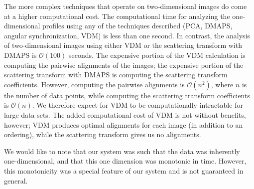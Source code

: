 \documentclass[10pt]{article}
\begin{document}
The more complex techniques that operate on two-dimensional images do come at a higher computational cost. 
%
The computational time for analyzing the one-dimensional profiles using any of the techniques described (PCA, DMAPS, angular synchronization, VDM) is less than one second. 
%
In contrast, the analysis of two-dimensional images using either VDM or the scattering transform with DMAPS is $\mathcal{O}(100)$ seconds.
%
The expensive portion of the VDM calculation is computing the pairwise alignments of the images; the expensive portion of the scattering transform with DMAPS is computing the scattering transform coefficients.
%
However, computing the pairwise alignments is $\mathcal{O}(n^2)$, where $n$ is the number of data points, while computing the scattering transform coefficients is $\mathcal{O}(n)$.
%
We therefore expect for VDM to be computationally intractable for large data sets.
%
The added computational cost of VDM is not without benefits, however; VDM produces optimal alignments for each image (in addition to an ordering), while the scattering transform gives us no alignments.

We would like to note that our system was such that the data was inherently one-dimensional, and that this one dimension was monotonic in time.
%
However, this monotonicity was a special feature of our system and is not guaranteed in general.


\end{document}
